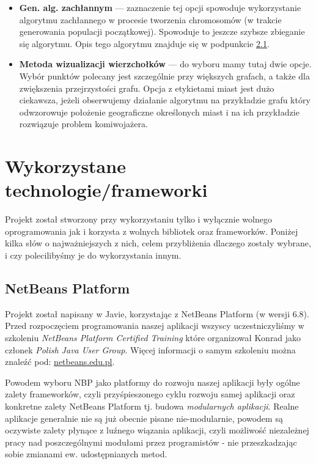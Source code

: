 \documentclass[a4paper]{article}
\begin{document}
\begin{itemize}
 \item \textbf{Gen. alg. zachłannym} --- zaznaczenie tej opcji spowoduje wykorzystanie algorytmu zachłannego w procesie tworzenia chromosomów (w trakcie generowania populacji początkowej). Spowoduje to jeszcze szybsze zbieganie się algorytmu. Opis tego algorytmu znajduje się w podpunkcie \hyperlink{chromosomy}{2.1}.

 \item \textbf{Metoda wizualizacji wierzchołków} --- do wyboru mamy tutaj dwie opcje. Wybór punktów polecany jest szczególnie przy większych grafach, a także dla zwiększenia przejrzystości grafu. Opcja z etykietami miast jest dużo ciekawsza, jeżeli obserwujemy działanie algorytmu na przykładzie grafu który odwzorowuje położenie geograficzne określonych miast i na ich przykładzie rozwiązuje problem komiwojażera.
\end{itemize}


\newpage
\section{Wykorzystane technologie/frameworki}
Projekt został stworzony przy wykorzystaniu tylko i wyłącznie wolnego oprogramowania jak i korzysta z wolnych bibliotek oraz frameworków. Poniżej kilka słów o najważniejszych z nich, celem przybliżenia dlaczego zostały wybrane, i czy polecilibyśmy je do wykorzystania innym.

\subsection{NetBeans Platform}
Projekt został napisany w Javie, korzystając z NetBeans Platform (w wersji 6.8). Przed rozpoczęciem programowania naszej aplikacji wszyscy uczestniczyliśmy w szkoleniu \textit{NetBeans Platform Certified Training} które organizował Konrad jako członek \textit{Polish Java User Group}. Więcej informacji o samym szkoleniu można znaleźć pod: \href{http://www.netbeans.edu.pl}{netbeans.edu.pl}.

Powodem wyboru NBP jako platformy do rozwoju naszej aplikacji były ogólne zalety frameworków, czyli przyśpieszonego cyklu rozwoju samej aplikacji oraz konkretne zalety NetBeans Platform tj. budowa \textit{modularnych aplikacji}. Realne aplikacje generalnie nie są już obecnie pisane nie-modularnie, powodem są oczywiste zalety płynące z luźnego wiązania aplikacji, czyli możliwość niezależnej pracy nad poszczególnymi modułami przez programistów - nie przeszkadzając sobie zmianami ew. udostępnianych metod. 
\end{document}

